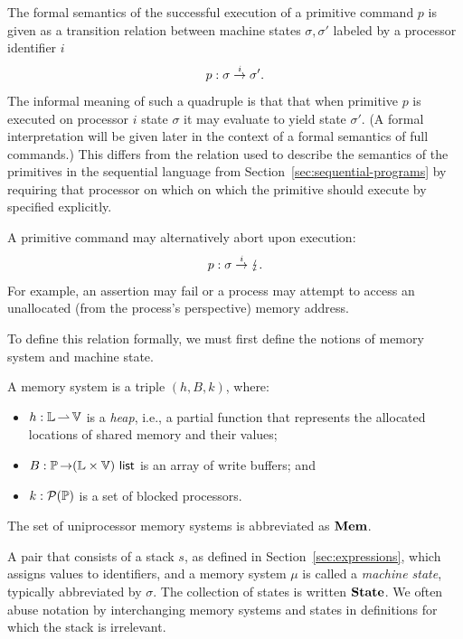 \documentclass[11pt]{report}
\begin{document}
The formal semantics of the successful execution of a primitive command $p$ is given as a transition relation between machine states $\sigma,\sigma'$ labeled by a processor identifier $i$ \[ p : \sigma \stackrel{i}{\rightarrow} \sigma'. \] The informal meaning of such a quadruple is that that when primitive $p$ is executed on processor $i$ state $\sigma$ it may evaluate to yield state $\sigma'$. (A formal interpretation will be given later in the context of a formal semantics of full commands.) This differs from the relation used to describe the semantics of the primitives in the sequential language from Section~\ref{sec:sequential-programs} by requiring that processor on which on which the primitive should execute by specified explicitly. 

A primitive command may alternatively abort upon execution: \[ p : \sigma \stackrel{i}{\rightarrow} \lightning. \] For example, an assertion may fail or a process may attempt to access an unallocated (from the process's perspective) memory address. 

To define this relation formally, we must first define the notions of memory system and machine state. 
\begin{definition}
A memory system is a triple $(h,B,k)$, where: \begin{itemize}
	\item $h : \mathbb{L} \operatorname{\rightharpoonup} \mathbb{V}$ is a \emph{heap}, i.e., a partial function that represents the allocated locations of shared memory and their values; 
	\item $B : \mathbb{P} \operatorname{\rightarrow} (\mathbb{L} \times \mathbb{V})~\mathsf{list}$ is an array of write buffers; and
	\item $k : \mathcal{P}(\mathbb{P})$ is a set of blocked processors. 
\end{itemize}
\end{definition} 
The set of uniprocessor memory systems is abbreviated as $\mathbf{Mem}$.

A pair that consists of a stack $s$, as defined in Section~\ref{sec:expressions}, which assigns values to identifiers, and a memory system $\mu$ is called a \emph{machine state}, typically abbreviated by $\sigma$. The collection of states is written $\mathbf{State}$. We often abuse notation by interchanging memory systems and states in definitions for which the stack is irrelevant. 
\end{document}
